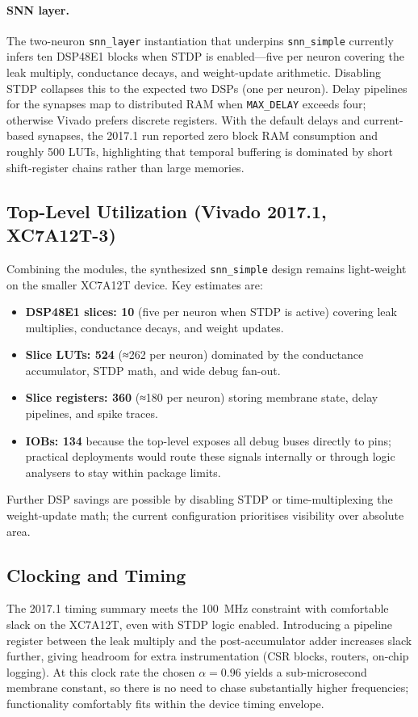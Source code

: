 \documentclass[10pt,onecolumn]{IEEEtran}
\begin{document}
\paragraph{SNN layer.} The two-neuron \texttt{snn\_layer} instantiation that underpins \texttt{snn\_simple} currently infers ten DSP48E1 blocks when STDP is enabled—five per neuron covering the leak multiply, conductance decays, and weight-update arithmetic. Disabling STDP collapses this to the expected two DSPs (one per neuron). Delay pipelines for the synapses map to distributed RAM when \texttt{MAX\_DELAY} exceeds four; otherwise Vivado prefers discrete registers. With the default delays and current-based synapses, the 2017.1 run reported zero block RAM consumption and roughly 500 LUTs, highlighting that temporal buffering is dominated by short shift-register chains rather than large memories.

\subsection{Top-Level Utilization (Vivado 2017.1, XC7A12T-3)}
Combining the modules, the synthesized \texttt{snn\_simple} design remains light-weight on the smaller XC7A12T device. Key estimates are:
\begin{itemize}
  \item \textbf{DSP48E1 slices: 10} (five per neuron when STDP is active) covering leak multiplies, conductance decays, and weight updates.
  \item \textbf{Slice LUTs: 524} (≈262 per neuron) dominated by the conductance accumulator, STDP math, and wide debug fan-out.
  \item \textbf{Slice registers: 360} (≈180 per neuron) storing membrane state, delay pipelines, and spike traces.
  \item \textbf{IOBs: 134} because the top-level exposes all debug buses directly to pins; practical deployments would route these signals internally or through logic analysers to stay within package limits.
\end{itemize}
Further DSP savings are possible by disabling STDP or time-multiplexing the weight-update math; the current configuration prioritises visibility over absolute area.

\subsection{Clocking and Timing}
The 2017.1 timing summary meets the 100~MHz constraint with comfortable slack on the XC7A12T, even with STDP logic enabled. Introducing a pipeline register between the leak multiply and the post-accumulator adder increases slack further, giving headroom for extra instrumentation (CSR blocks, routers, on-chip logging). At this clock rate the chosen \(\alpha=0.96\) yields a sub-microsecond membrane constant, so there is no need to chase substantially higher frequencies; functionality comfortably fits within the device timing envelope.
\end{document}
